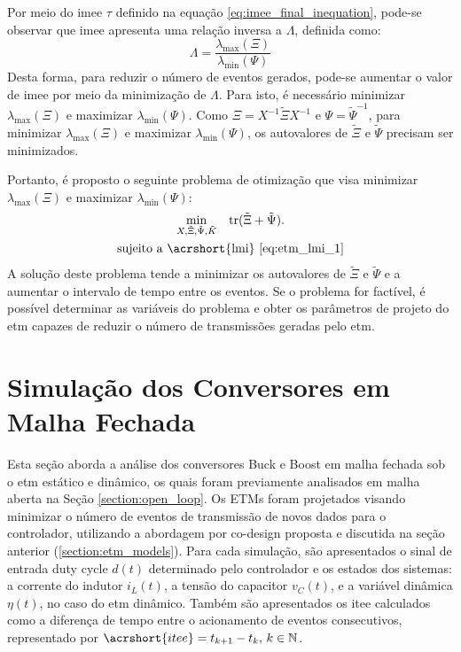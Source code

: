 Por meio do \acrshort{imee} $\tau$ definido na equação \eqref{eq:imee_final_inequation}, pode-se observar que \acrshort{imee} apresenta uma relação inversa a $\Lambda$, definida como: \begin{equation}
  \Lambda = \frac{\lambda_{\max}(\Xi)}{\lambda_{\min}(\Psi)}
\end{equation} Desta forma, para reduzir o número de eventos gerados, pode-se aumentar o valor de \acrshort{imee} por meio da minimização de $\Lambda$. Para isto, é necessário minimizar $\lambda_{\max} (\Xi)$ e maximizar $\lambda_{\min}(\Psi)$. Como $\Xi = X^{-1}\tilde{\Xi}X^{-1}$ e $\Psi = \tilde{\Psi}^{-1}$, para minimizar $\lambda_{\max} (\Xi)$ e maximizar $\lambda_{\min}(\Psi)$, os autovalores de $\tilde{\Xi}$ e $\tilde{\Psi}$ precisam ser minimizados.

Portanto, é proposto o seguinte problema de otimização que visa minimizar $\lambda_{\max} (\Xi)$ e maximizar $\lambda_{\min}(\Psi)$: \begin{gather}\underset{X, \tilde{\Xi}, \tilde{\Psi}, \tilde{K}}\min \quad \mathrm{tr}(\tilde{\Xi} + \tilde{\Psi}). \\ \textrm{sujeito a \acrshort{lmi} } \eqref{eq:etm_lmi_1} \label{eq:optimization_problem}\end{gather} A solução deste problema tende a minimizar os autovalores de $\tilde{\Xi}$ e $\tilde{\Psi}$ e a aumentar o intervalo de tempo entre os eventos. Se o problema for factível, é possível determinar as variáveis do problema e obter os parâmetros de projeto do \acrshort{etm} capazes de reduzir o número de transmissões geradas pelo \acrshort{etm}.

\section{Simulação dos Conversores em Malha Fechada}

Esta seção aborda a análise dos conversores Buck e Boost em malha fechada sob o \acrshort{etm} estático e dinâmico, os quais foram previamente analisados em malha aberta na Seção \ref{section:open_loop}. Os ETMs foram projetados visando minimizar o número de eventos de transmissão de novos dados para o controlador, utilizando a abordagem por co-design proposta e discutida na seção anterior (\autoref{section:etm_models}). Para cada simulação, são apresentados o sinal de entrada duty cycle $d(t)$ determinado pelo controlador e os estados dos sistemas: a corrente do indutor $i_L(t)$, a tensão do capacitor $v_C(t)$, e a variável dinâmica $\eta(t)$, no caso do \acrshort{etm} dinâmico. Também são apresentados os \acrfull{itee} calculados como a diferença de tempo entre o acionamento de eventos consecutivos, representado por $\acrshort{itee} = t_{k + 1} - t_k, \, k \in \mathbb{N}$.


